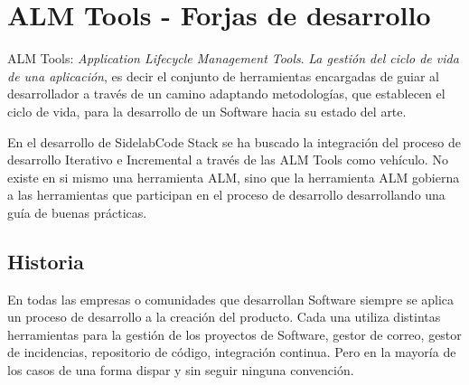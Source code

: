 %
% 

\chapter{ALM Tools - Forjas de desarrollo}
\label{chap:almtools}

\begin{comment}
* ALM Tools
    * Qué es una forja
    * Objetivos
    * Componentes
        * Estudio del arte de forjas
    * Problemática -> administración, costes...
        * Tablas comparativas
    * Algunos ejemplos y sus limitaciones
    * Conclusiones del estudio de forjas
\end{comment}

\par ALM Tools: \emph{Application Lifecycle Management Tools}. \emph{La gesti\'on del ciclo de vida de una aplicaci\'on}, es decir el conjunto de herramientas encargadas de guiar al desarrollador a trav\'es de un camino adaptando metodolog\'ias, que establecen el ciclo de vida, para la desarrollo de un Software hacia su estado del arte.

\par En el desarrollo de SidelabCode Stack se ha buscado la integración del proceso de desarrollo Iterativo e Incremental a trav\'es de las ALM Tools como veh\'iculo. No existe en si mismo una herramienta ALM, sino que la herramienta ALM gobierna a las herramientas que participan en el proceso de desarrollo desarrollando una guía de buenas prácticas.

\section{Historia}
\label{sec:historia}

\par En todas las empresas o comunidades que desarrollan Software siempre se aplica un proceso de desarrollo a la creación del producto. Cada una utiliza distintas herramientas para la gesti\'on de los proyectos de Software, gestor de correo, gestor de incidencias, repositorio de c\'odigo, integraci\'on continua. Pero en la mayor\'ia de los casos de una forma dispar y sin seguir ninguna convención.

